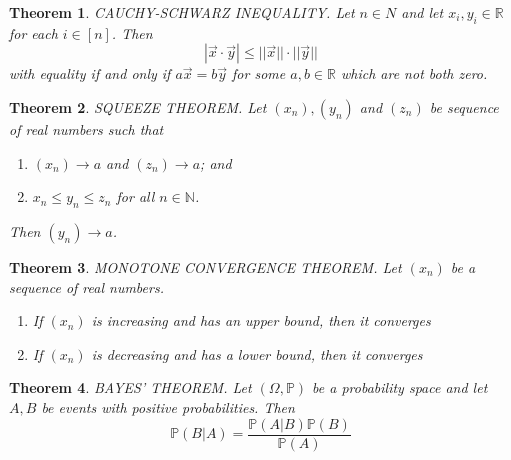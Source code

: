 \documentclass[12pt]{article}
\newtheorem{theorem}{Theorem}
\newcommand{\R}{\mathbb{R}}
\newcommand{\N}{\mathbb{N}}
\begin{document}
\begin{theorem}
CAUCHY-SCHWARZ INEQUALITY. Let $n \in N$ and let $x_i, y_i \in \R$ for each $i \in [n]$. Then 
$$|\vec{x} \cdot \vec{y}| \leq ||\vec{x}||\cdot||\vec{y}||$$
with equality if and only if $a\vec{x} = b\vec{y}$ for some $a, b \in \R$ which are not both zero. 
\end{theorem}


\begin{theorem}
SQUEEZE THEOREM. Let $(x_n), (y_n)$ and $(z_n)$ be sequence of real numbers such that 
\begin{enumerate}
    \item $(x_n) \to a$ and $(z_n) \to a$; and 
    \item $x_n \leq y_n \leq z_n$ for all $n \in \N$. 
\end{enumerate}
Then $(y_n) \to a$.
\end{theorem}


\begin{theorem}
MONOTONE CONVERGENCE THEOREM. Let $(x_n)$ be a sequence of real numbers. 
\begin{enumerate}
    \item If $(x_n)$ is increasing and has an upper bound, then it converges
    \item If $(x_n)$ is decreasing and has a lower bound, then it converges
\end{enumerate}
\end{theorem}


\begin{theorem}
BAYES' THEOREM. Let $(\Omega, \mathbb{P})$ be a probability space and let $A, B$ be events with positive probabilities. Then 
$$\mathbb{P}(B | A) = \frac{\mathbb{P}(A | B)\mathbb{P}(B)}{\mathbb{P}(A)}$$

\end{theorem}
\end{document}
